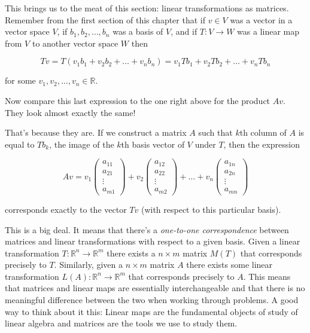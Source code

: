\documentclass[12pt]{article}
\begin{document}
\vskip 3mm
This brings us to the meat of this section: linear transformations as matrices. Remember from the first section of this chapter that if $v \in V$ was a vector in a vector space $V$, if $b_1, b_2, \ldots, b_n$ was a basis of $V$, and if $T : V \rightarrow W$ was a linear map from $V$ to another vector space $W$ then

$$Tv = T(v_1 b_1 + v_2 b_2 + \ldots + v_n b_n) = v_1 Tb_1 + v_2 Tb_2 + \ldots + v_n Tb_n$$

for some $v_1, v_2, \ldots, v_n \in \mathbb{R}$.

\vskip 3mm

Now compare this last expression to the one right above for the product $Av$. They look almost exactly the same!

\vskip 2mm
That's because they are. If we construct a matrix $A$ such that $k$th column of $A$ is equal to $Tb_k$, the image of the $k$th basis vector of $V$ under $T$, then the expression

\[ Av = 
%
v_1  \begin{pmatrix}
a_{11} \\
a_{21} \\
\vdots \\
a_{m1}
\end{pmatrix} +
%
v_2  \begin{pmatrix}
a_{12} \\
a_{22} \\
\vdots \\
a_{m2}
\end{pmatrix} +
\ldots +
%
v_n  \begin{pmatrix}
a_{1n} \\
a_{2n} \\
\vdots \\
a_{mn}
\end{pmatrix} \]

\vskip 1mm

corresponds exactly to the vector $Tv$ (with respect to this particular basis).

\vskip 3mm
This is a big deal. It means that there's a \textit{one-to-one correspondence} between matrices and linear transformations with respect to a given basis. Given a linear transformation $T : \mathbb{R}^n \rightarrow \mathbb{R}^m$ there exists a $n \times m$ matrix $M(T)$ that corresponds precisely to $T$. Similarly, given a $n \times m$ matrix $A$ there exists some linear transformation $L(A) : \mathbb{R}^n \rightarrow \mathbb{R}^m$ that corresponds precisely to $A$. This means that matrices and linear maps are essentially interchangeable and that there is no meaningful difference between the two when working through problems. A good way to think about it this:  Linear maps are the fundamental objects of study of linear algebra and matrices are the tools we use to study them.
\end{document}
